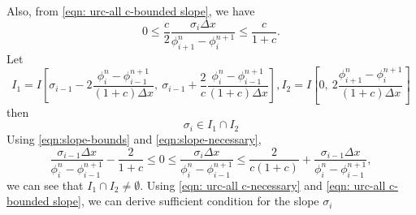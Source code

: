 \documentclass[../thesis.tex]{subfiles}
\begin{document}
Also, from \eqref{eqn: urc-all c-bounded slope}, we have
\begin{equation}
    0
    \leq
    \frac{c}{2}
    \frac{\sigma_{i}\Delta x}
    {\phi_{i+1}^{n} - \phi_{i}^{n+1}}
    \leq
    \frac{c}{1+c}.
\end{equation}
Let
\begin{equation}
    I_{1}=I\left[
        \sigma_{i-1}
        -2\frac{\phi_{i}^{n} - \phi_{i-1}^{n+1}}
        {(1+c)\Delta x},
        ~\sigma_{i-1}
        +\frac{2}{c}
        \frac{\phi_{i}^{n} - \phi_{i-1}^{n+1}}
        {(1+c)\Delta x}
    \right],
    I_{2} = I\left[
        0,
        ~2\frac{\phi_{i+1}^{n} - \phi_{i}^{n+1}}{(1+c)\Delta x}
    \right]
\end{equation}
then
\begin{equation}
    \sigma_{i}
    \in
    I_{1}
    \cap
    I_{2}
\end{equation}
Using \eqref{eqn:slope-bounds} and \eqref{eqn:slope-necessary},
\begin{equation}
        \frac{\sigma_{i-1}\Delta x}
        {\phi_{i}^{n} - \phi_{i-1}^{n+1}}
        -\frac{2}{1+c}
        \leq
        0
        \leq
        \frac{\sigma_{i}\Delta x}
        {\phi_{i}^{n} - \phi_{i-1}^{n+1}}
        \leq
        \frac{2}{c(1+c)}
        + \frac{\sigma_{i-1}\Delta x}
        {\phi_{i}^{n} - \phi_{i-1}^{n+1}},
\end{equation}
we can see that \(I_{1} \cap I_{2} \neq \emptyset\).
Using \eqref{eqn: urc-all c-necessary} and \eqref{eqn: urc-all c-bounded slope}, we can derive sufficient condition for the slope \(\sigma_{i}\)
\end{document}
